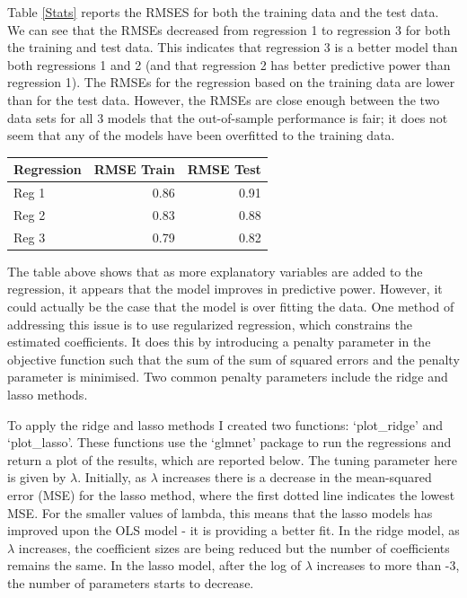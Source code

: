 \documentclass[11pt,preprint, authoryear]{elsarticle}
\let\origtable\table
\let\endorigtable\endtable
\renewenvironment{table}[1][2] {
    \expandafter\origtable\expandafter[H]
} {
    \endorigtable
}
\numberwithin{equation}{section}
\numberwithin{figure}{section}
\numberwithin{table}{section}
\begin{document}
Table \ref{Stats} reports the RMSES for both the training data and the
test data. We can see that the RMSEs decreased from regression 1 to
regression 3 for both the training and test data. This indicates that
regression 3 is a better model than both regressions 1 and 2 (and that
regression 2 has better predictive power than regression 1). The RMSEs
for the regression based on the training data are lower than for the
test data. However, the RMSEs are close enough between the two data sets
for all 3 models that the out-of-sample performance is fair; it does not
seem that any of the models have been overfitted to the training data.

\begin{table}[H]
\centering
\caption{Regression RMSEs and Observations} 
\label{Stats}
\begin{tabular}{lrr}
  \hline
Regression & RMSE Train & RMSE Test \\ 
  \hline
Reg 1 & 0.86 & 0.91 \\ 
  Reg 2 & 0.83 & 0.88 \\ 
  Reg 3 & 0.79 & 0.82 \\ 
   \hline
\end{tabular}
\end{table}

The table above shows that as more explanatory variables are added to
the regression, it appears that the model improves in predictive power.
However, it could actually be the case that the model is over fitting
the data. One method of addressing this issue is to use regularized
regression, which constrains the estimated coefficients. It does this by
introducing a penalty parameter in the objective function such that the
sum of the sum of squared errors and the penalty parameter is minimised.
Two common penalty parameters include the ridge and lasso methods.

To apply the ridge and lasso methods I created two functions:
`plot\_ridge' and `plot\_lasso'. These functions use the `glmnet'
package to run the regressions and return a plot of the results, which
are reported below. The tuning parameter here is given by \(\lambda\).
Initially, as \(\lambda\) increases there is a decrease in the
mean-squared error (MSE) for the lasso method, where the first dotted
line indicates the lowest MSE. For the smaller values of lambda, this
means that the lasso models has improved upon the OLS model - it is
providing a better fit. In the ridge model, as \(\lambda\) increases,
the coefficient sizes are being reduced but the number of coefficients
remains the same. In the lasso model, after the log of \(\lambda\)
increases to more than -3, the number of parameters starts to decrease.
\end{document}
